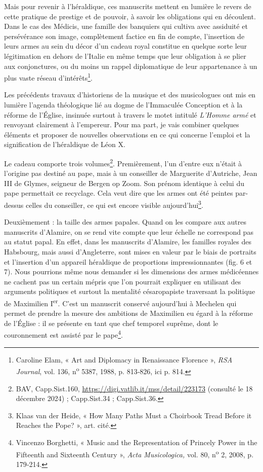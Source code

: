 \documentclass[12pt,twoside,openany]{book}
\begin{document}
Mais pour revenir à l’héraldique, ces manuscrits mettent en lumière le revers de cette pratique de prestige et de pouvoir, à savoir les obligations qui en découlent. Dans le cas des Médicis, une famille des banquiers qui cultiva avec assiduité et persévérance son image, complètement factice en fin de compte, l’insertion de leurs armes au sein du décor d’un cadeau royal constitue en quelque sorte leur légitimation en dehors de l’Italie en même temps que leur obligation à se plier aux conjonctures, ou du moins un rappel diplomatique de leur appartenance à un plus vaste réseau d’intérêts\footnote{Caroline Elam, « Art and Diplomacy in Renaissance Florence », \textit{RSA Journal}, vol. 136, n\textsuperscript{o} 5387, 1988, p. 813‑826, ici p. 814.}.

Les précédents travaux d’historiens de la musique et des musicologues ont mis en lumière l’agenda théologique lié au dogme de l’Immaculée Conception et à la réforme de l’Église, insinuée surtout à travers le motet intitulé \textit{L’Homme armé} et renvoyant clairement à l’empereur. Pour ma part, je vais combiner quelques éléments et proposer de nouvelles observations en ce qui concerne l’emploi et la signification de l’héraldique de Léon X.

Le cadeau comporte trois volumes\footnote{BAV, Capp.Sist.160, \href{https://digi.vatlib.it/mss/detail/223173}{https://digi.vatlib.it/mss/detail/223173} (consulté le 18 décembre 2024) ; Capp.Sist.34 ; Capp.Sist.36.}. Premièrement, l’un d’entre eux n’était à l’origine pas destiné au pape, mais à un conseiller de Marguerite d’Autriche, Jean III de Glymes, seigneur de Bergen op Zoom. Son prénom identique à celui du pape permettait ce recyclage. Cela veut dire que les armes ont été peintes par-dessus celles du conseiller, ce qui est encore visible aujourd’hui\footnote{Klaas van der Heide, « How Many Paths Must a Choirbook Tread Before it Reaches the Pope? », art. cité.}.

Deuxièmement : la taille des armes papales. Quand on les compare aux autres manuscrits d’Alamire, on se rend vite compte que leur échelle ne correspond pas au statut papal. En effet, dans les manuscrits d’Alamire, les familles royales des Habsbourg, mais aussi d’Angleterre, sont mises en valeur par le biais de portraits et l’insertion d’un appareil héraldique de proportions impressionnantes (fig. 6 et 7). Nous pourrions même nous demander si les dimensions des armes médicéennes ne cachent pas un certain mépris que l’on pourrait expliquer en utilisant des arguments politiques et surtout la mentalité césaropapiste traversant la politique de Maximilien I\textsuperscript{er}. C’est un manuscrit conservé aujourd’hui à Mechelen qui permet de prendre la mesure des ambitions de Maximilien eu égard à la réforme de l’Église : il se présente en tant que chef temporel suprême, dont le couronnement est assisté par le pape\footnote{Vincenzo Borghetti, « Music and the Representation of Princely Power in the Fifteenth and Sixteenth Century », \textit{Acta Musicologica, }vol. 80, n\textsuperscript{o} 2, 2008, p. 179‑214.}.
\end{document}
